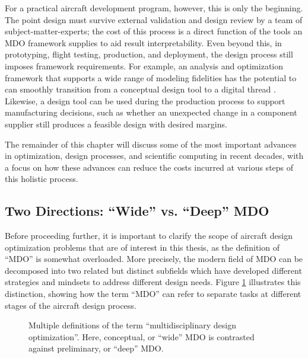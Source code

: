 \documentclass[12pt,vi,oneside,table]{report}
\begin{document}
    For a practical aircraft development program, however, this is only the beginning. The point design must survive external validation and design review by a team of subject-matter-experts; the cost of this process is a direct function of the tools an MDO framework supplies to aid result interpretability. Even beyond this, in prototyping, flight testing, production, and deployment, the design process still imposes framework requirements. For example, an analysis and optimization framework that supports a wide range of modeling fidelities has the potential to can smoothly transition from a conceptual design tool to a digital thread \cite{niederer_scaling_2021, singh_engineering_2018}. Likewise, a design tool can be used during the production process to support manufacturing decisions, such as whether an unexpected change in a component supplier still produces a feasible design with desired margins.

    The remainder of this chapter will discuss some of the most important advances in optimization, design processes, and scientific computing in recent decades, with a focus on how these advances can reduce the costs incurred at various steps of this holistic process.

    \subsection{Two Directions: ``Wide'' vs. ``Deep'' MDO}
    \label{sec:wide_vs_deep}

    Before proceeding further, it is important to clarify the scope of aircraft design optimization problems that are of interest in this thesis, as the definition of ``MDO'' is somewhat overloaded. More precisely, the modern field of MDO can be decomposed into two related but distinct subfields which have developed different strategies and mindsets to address different design needs. Figure \ref{fig:mdo_overloaded_term} illustrates this distinction, showing how the term ``MDO'' can refer to separate tasks at different stages of the aircraft design process.

    \begin{figure}[h]
        \centering
        \caption{Multiple definitions of the term ``multidisciplinary design optimization''. Here, conceptual, or ``wide'' MDO is contrasted against preliminary, or ``deep'' MDO.}
        \label{fig:mdo_overloaded_term}
    \end{figure}
\end{document}
